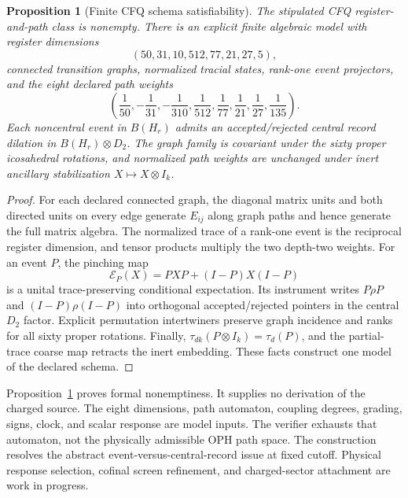 \documentclass[11pt]{article}
\newtheorem{proposition}[theorem]{Proposition}
\begin{document}
\begin{proposition}[Finite CFQ schema satisfiability]
\label{prop:charged-cfq-digital-model}
The stipulated CFQ register-and-path class is nonempty.  There is an explicit
finite algebraic model with register dimensions
\[
(50,31,10,512,77,21,27,5),
\]
connected transition graphs, normalized tracial states, rank-one event
projectors, and the eight declared path weights
\[
\left(\frac1{50},-\frac1{31},-\frac1{310},\frac1{512},
\frac1{77},\frac1{21},\frac1{27},\frac1{135}\right).
\]
Each noncentral event in \(B(H_r)\) admits an accepted/rejected central record
dilation in \(B(H_r)\otimes D_2\).  The graph family is covariant under the
sixty proper icosahedral rotations, and normalized path weights are unchanged
under inert ancillary stabilization \(X\mapsto X\otimes I_k\).
\end{proposition}

\begin{proof}
For each declared connected graph, the diagonal matrix units and both directed
units on every edge generate \(E_{ij}\) along graph paths and hence generate
the full matrix algebra.  The normalized trace of a rank-one event is the
reciprocal register dimension, and tensor products multiply the two depth-two
weights.  For an event \(P\), the pinching map
\[
\mathcal E_P(X)=PXP+(I-P)X(I-P)
\]
is a unital trace-preserving conditional expectation.  Its instrument writes
\(P\rho P\) and \((I-P)\rho(I-P)\) into orthogonal accepted/rejected pointers in
the central \(D_2\) factor.  Explicit permutation intertwiners preserve graph
incidence and ranks for all sixty proper rotations.  Finally,
\(\tau_{dk}(P\otimes I_k)=\tau_d(P)\), and the partial-trace coarse map retracts
the inert embedding.  These facts construct one model of the declared schema.
\end{proof}

Proposition~\ref{prop:charged-cfq-digital-model} proves formal nonemptiness.
It supplies no derivation of the charged source.  The eight dimensions, path
automaton, coupling degrees, grading, signs, clock, and scalar response are
model inputs.  The verifier exhausts that automaton, not the physically
admissible OPH path space.  The construction resolves the abstract
event-versus-central-record issue at fixed cutoff.  Physical response
selection, cofinal screen refinement, and charged-sector attachment are work
in progress.
\end{document}
